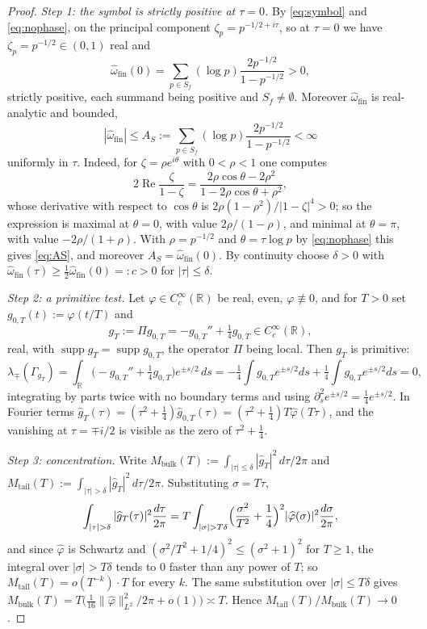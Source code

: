 \documentclass[11pt]{amsart}
\theoremstyle{definition}
\theoremstyle{remark}
\newcommand{\R}{\mathbb R}
\newcommand{\Rel}{\operatorname{Re}}
\newcommand{\supp}{\operatorname{supp}}
\begin{document}
\begin{proof}
\emph{Step 1: the symbol is strictly positive at $\tau=0$.} By
\eqref{eq:symbol} and \eqref{eq:nophase}, on the principal component
$\zeta_p=p^{-1/2+i\tau}$, so at $\tau=0$ we have $\zeta_p=p^{-1/2}\in(0,1)$
real and
\begin{equation}\label{eq:omegafin0}
  \widehat\omega_{\mathrm{fin}}(0)
   =\sum_{p\in S_f}(\log p)\frac{2p^{-1/2}}{1-p^{-1/2}}>0,
\end{equation}
strictly positive, each summand being positive and $S_f\ne\emptyset$. Moreover
$\widehat\omega_{\mathrm{fin}}$ is real-analytic and bounded,
\begin{equation}\label{eq:AS}
  |\widehat\omega_{\mathrm{fin}}|\le A_S
   :=\sum_{p\in S_f}(\log p)\frac{2p^{-1/2}}{1-p^{-1/2}}<\infty
\end{equation}
uniformly in $\tau$. Indeed, for $\zeta=\rho e^{i\theta}$ with $0<\rho<1$ one
computes
\[
  2\Rel\frac{\zeta}{1-\zeta}
   =\frac{2\rho\cos\theta-2\rho^2}{1-2\rho\cos\theta+\rho^2},
\]
whose derivative with respect to $\cos\theta$ is
$2\rho(1-\rho^2)/|1-\zeta|^4>0$; so the expression is maximal at $\theta=0$,
with value $2\rho/(1-\rho)$, and minimal at $\theta=\pi$, with value
$-2\rho/(1+\rho)$. With $\rho=p^{-1/2}$ and $\theta=\tau\log p$ by
\eqref{eq:nophase} this gives \eqref{eq:AS}, and moreover
$A_S=\widehat\omega_{\mathrm{fin}}(0)$. By continuity choose $\delta>0$ with
$\widehat\omega_{\mathrm{fin}}(\tau)\ge\tfrac12\widehat\omega_{\mathrm{fin}}(0)
=:c>0$ for $|\tau|\le\delta$.

\emph{Step 2: a primitive test.} Let $\varphi\in C_c^\infty(\R)$ be real, even,
$\varphi\not\equiv0$, and for $T>0$ set $g_{0,T}(t):=\varphi(t/T)$ and
\[
  g_T:=\Pi g_{0,T}=-g_{0,T}''+\tfrac14g_{0,T}\in C_c^\infty(\R),
\]
real, with $\supp g_T=\supp g_{0,T}$, the operator $\Pi$ being local. Then
$g_T$ is primitive:
\[
  \lambda_\mp(\Gamma_{g_T})
   =\int_\R\bigl(-g_{0,T}''+\tfrac14g_{0,T}\bigr)e^{\pm s/2}\,ds
   =-\tfrac14\int g_{0,T}e^{\pm s/2}ds+\tfrac14\int g_{0,T}e^{\pm s/2}ds=0,
\]
integrating by parts twice with no boundary terms and using
$\partial_s^2e^{\pm s/2}=\tfrac14e^{\pm s/2}$. In Fourier terms
$\widehat g_T(\tau)=(\tau^2+\tfrac14)\widehat g_{0,T}(\tau)
=(\tau^2+\tfrac14)T\widehat\varphi(T\tau)$, and the vanishing at
$\tau=\mp i/2$ is visible as the zero of $\tau^2+\tfrac14$.

\emph{Step 3: concentration.} Write
$M_{\mathrm{bulk}}(T):=\int_{|\tau|\le\delta}|\widehat g_T|^2\,d\tau/2\pi$ and
$M_{\mathrm{tail}}(T):=\int_{|\tau|>\delta}|\widehat g_T|^2\,d\tau/2\pi$.
Substituting $\sigma=T\tau$,
\[
  \int_{|\tau|>\delta}|\widehat g_T(\tau)|^2\frac{d\tau}{2\pi}
   =T\int_{|\sigma|>T\delta}\Bigl(\frac{\sigma^2}{T^2}+\frac14\Bigr)^2
     |\widehat\varphi(\sigma)|^2\frac{d\sigma}{2\pi},
\]
and since $\widehat\varphi$ is Schwartz and
$(\sigma^2/T^2+1/4)^2\le(\sigma^2+1)^2$ for $T\ge1$, the integral over
$|\sigma|>T\delta$ tends to $0$ faster than any power of $T$; so
$M_{\mathrm{tail}}(T)=o(T^{-k})\cdot T$ for every $k$. The same substitution
over $|\sigma|\le T\delta$ gives
$M_{\mathrm{bulk}}(T)=T\bigl(\tfrac1{16}\|\widehat\varphi\|_{L^2}^2/2\pi
+o(1)\bigr)\asymp T$. Hence
$M_{\mathrm{tail}}(T)/M_{\mathrm{bulk}}(T)\to0$.


\end{proof}
\end{document}
